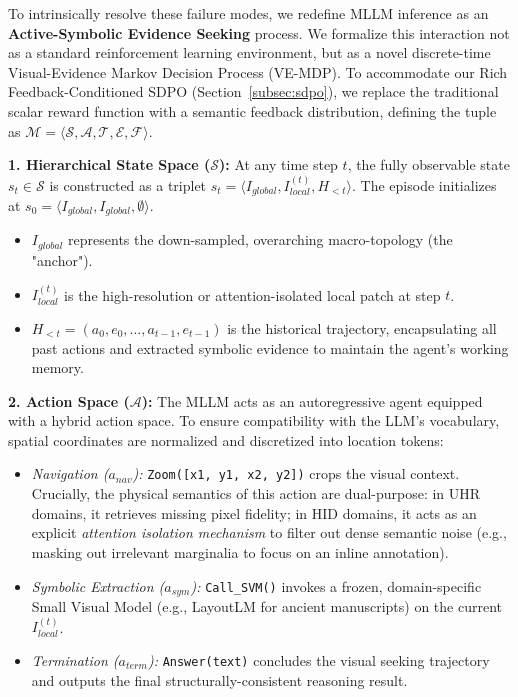\documentclass{article}
\begin{document}
To intrinsically resolve these failure modes, we redefine MLLM inference as an \textbf{Active-Symbolic Evidence Seeking} process. We formalize this interaction not as a standard reinforcement learning environment, but as a novel discrete-time Visual-Evidence Markov Decision Process (VE-MDP). To accommodate our Rich Feedback-Conditioned SDPO (Section~\ref{subsec:sdpo}), we replace the traditional scalar reward function with a semantic feedback distribution, defining the tuple as $\mathcal{M} = \langle \mathcal{S}, \mathcal{A}, \mathcal{T}, \mathcal{E}, \mathcal{F} \rangle$.

\textbf{1. Hierarchical State Space ($\mathcal{S}$):} 
At any time step $t$, the fully observable state $s_t \in \mathcal{S}$ is constructed as a triplet $s_t = \langle I_{global}, I_{local}^{(t)}, H_{<t} \rangle$. The episode initializes at $s_0 = \langle I_{global}, I_{global}, \emptyset \rangle$.
\begin{itemize}
    \item $I_{global}$ represents the down-sampled, overarching macro-topology (the "anchor").
    \item $I_{local}^{(t)}$ is the high-resolution or attention-isolated local patch at step $t$.
    \item $H_{<t} = (a_0, e_0, \dots, a_{t-1}, e_{t-1})$ is the historical trajectory, encapsulating all past actions and extracted symbolic evidence to maintain the agent's working memory.
\end{itemize}

\textbf{2. Action Space ($\mathcal{A}$):} 
The MLLM acts as an autoregressive agent equipped with a hybrid action space. To ensure compatibility with the LLM's vocabulary, spatial coordinates are normalized and discretized into location tokens:
\begin{itemize}
    \item \textit{Navigation ($a_{nav}$):} \texttt{Zoom([x1, y1, x2, y2])} crops the visual context. Crucially, the physical semantics of this action are dual-purpose: in UHR domains, it retrieves missing pixel fidelity; in HID domains, it acts as an explicit \textit{attention isolation mechanism} to filter out dense semantic noise (e.g., masking out irrelevant marginalia to focus on an inline annotation).
    \item \textit{Symbolic Extraction ($a_{sym}$):} \texttt{Call\_SVM()} invokes a frozen, domain-specific Small Visual Model (e.g., LayoutLM for ancient manuscripts) on the current $I_{local}^{(t)}$.
    \item \textit{Termination ($a_{term}$):} \texttt{Answer(text)} concludes the visual seeking trajectory and outputs the final structurally-consistent reasoning result.
\end{itemize}
\end{document}
